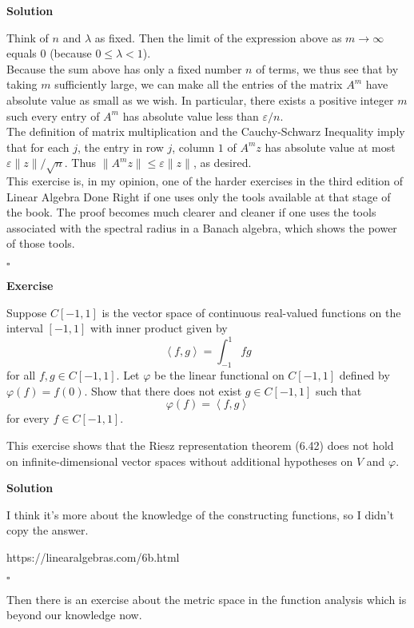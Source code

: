 \documentclass{article}
\newenvironment{exercise}{%
{\textbf{Exercise\\}
    }
}{
}
\newenvironment{solution}{%
{
    \textbf{Solution\\}
    }
}{
  \hfill $\square$ 
  \par\bigskip 
}
\begin{document}
\begin{CJK}{UTF8}{gkai}
\begin{solution}
    Think of $n$ and $\lambda$ as fixed. Then the limit of the expression above as $m\to \infty$ equals $0$ (because $0\leq \lambda <1$).\\
    
    Because the sum above has only a fixed number $n$ of terms, we thus see that by taking $m$ sufficiently large, we can make all the entries of the matrix $A^m$ have absolute value as small as we wish. In particular, there exists a positive integer $m$ such every entry of $A^m$ has absolute value less than $\varepsilon/n$.\\
    
    The definition of matrix multiplication and the Cauchy-Schwarz Inequality imply that for each $j$, the entry in row $j$, column $1$ of $A^m z$  has absolute value at most $\varepsilon\|z\|/\sqrt{n}$. Thus $\|A^m z\|\leq \varepsilon\|z\|$, as desired.\\
    
    This exercise is, in my opinion, one of the harder exercises in the third edition of Linear Algebra Done Right if one uses only the tools available at that stage of the book. The proof becomes much clearer and cleaner if one uses the tools associated with the spectral radius in a Banach algebra, which shows the power of those tools.
\end{solution}

\begin{exercise}
    Suppose $C[-1,1]$ is the vector space of continuous real-valued functions on the interval $[-1,1]$ with inner product given by
    \[\left< f, g\right> = \int_{-1}^{1}fg\]
    for all $f,g \in C[-1,1]$. Let $\varphi$ be the linear functional on $C[-1,1]$ defined by $\varphi(f) = f(0)$. Show that there does not exist $g \in C[-1,1]$ such that
    \[\varphi(f) = \left<f,g\right>\]
    for every $f \in C[-1,1]$.

    This exercise shows that the Riesz representation theorem (6.42) does not hold on infinite-dimensional vector spaces without additional hypotheses on $V$ and $\varphi$.
\end{exercise}

\begin{solution}
    I think it's more about the knowledge of the constructing functions, so I didn't copy the answer.

    https://linearalgebras.com/6b.html
\end{solution}

Then there is an exercise about the metric space in the function analysis which is beyond our knowledge now.


\end{CJK}
\end{document}
